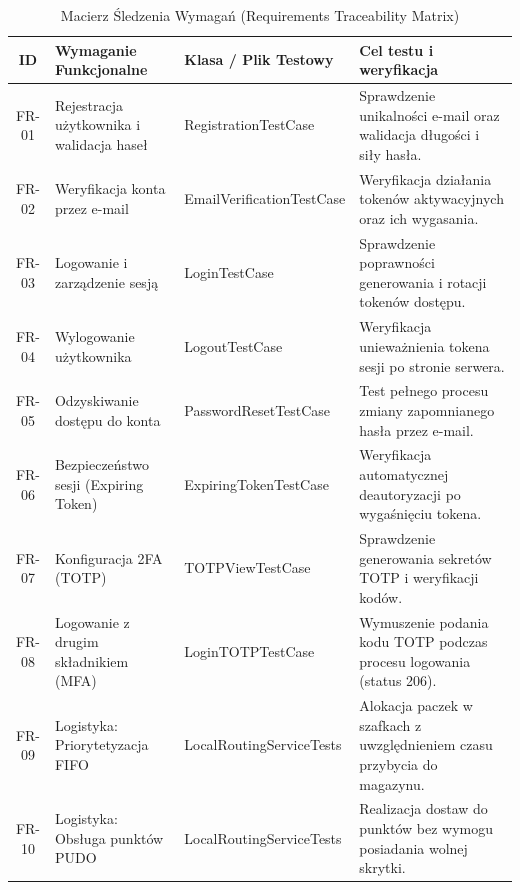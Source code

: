 \begin{table}[htbp]
    \centering
    \caption{Macierz Śledzenia Wymagań (Requirements Traceability Matrix)}
    \label{tab:rtm}
    \small 
    \renewcommand{\arraystretch}{1.5} %
    
    \begin{tabularx}{\textwidth}{|c|>{\hsize=0.9\hsize\raggedright\arraybackslash}X|>{\hsize=0.9\hsize\ttfamily\raggedright\arraybackslash}X|>{\hsize=1.2\hsize\raggedright\arraybackslash}X|}
        \hline
        \textbf{ID} & \textbf{Wymaganie Funkcjonalne} & \textbf{Klasa / Plik Testowy} & \textbf{Cel testu i weryfikacja} \\ \hline
        FR-01 & Rejestracja użytkownika i walidacja haseł & Registration\-Test\-Case & Sprawdzenie unikalności e-mail oraz walidacja długości i siły hasła. \\ \hline
        FR-02 & Weryfikacja konta przez e-mail & Email\-Verification\-Test\-Case & Weryfikacja działania tokenów aktywacyjnych oraz ich wygasania. \\ \hline
        FR-03 & Logowanie i zarządzenie sesją & Login\-Test\-Case & Sprawdzenie poprawności generowania i rotacji tokenów dostępu. \\ \hline
        FR-04 & Wylogowanie użytkownika & Logout\-Test\-Case & Weryfikacja unieważnienia tokena sesji po stronie serwera. \\ \hline
        FR-05 & Odzyskiwanie dostępu do konta & Password\-Reset\-Test\-Case & Test pełnego procesu zmiany zapomnianego hasła przez e-mail. \\ \hline
        FR-06 & Bezpieczeństwo sesji (Expiring Token) & Expiring\-Token\-Test\-Case & Weryfikacja automatycznej deautoryzacji po wygaśnięciu tokena. \\ \hline
        FR-07 & Konfiguracja 2FA (TOTP) & TOTP\-View\-Test\-Case & Sprawdzenie generowania sekretów TOTP i weryfikacji kodów. \\ \hline
        FR-08 & Logowanie z drugim składnikiem (MFA) & Login\-TOTP\-Test\-Case & Wymuszenie podania kodu TOTP podczas procesu logowania (status 206). \\ \hline
        FR-09 & Logistyka: Priorytetyzacja FIFO & Local\-Routing\-Service\-Tests & Alokacja paczek w szafkach z uwzględnieniem czasu przybycia do magazynu. \\ \hline
        FR-10 & Logistyka: Obsługa punktów PUDO & Local\-Routing\-Service\-Tests & Realizacja dostaw do punktów bez wymogu posiadania wolnej skrytki. \\ \hline
    \end{tabularx}
\end{table}

